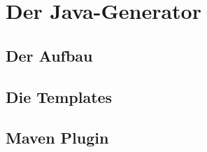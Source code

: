 \documentclass[./einleitung.tex]{subfiles}
\begin{document}
    \section{Der Java-Generator}
    \subsection{Der Aufbau}
    \subsection{Die Templates}
    \subsection{Maven Plugin}
\end{document}
